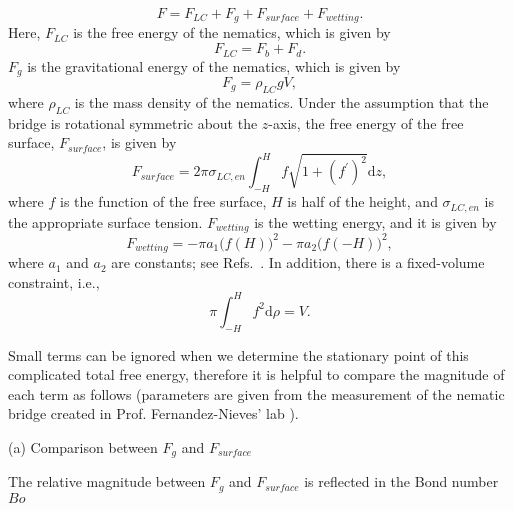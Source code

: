 \documentclass[nottitlepage]{article}
\begin{document}
\begin{equation}\label{eq:F17}
 F=F_{LC}+F_{g}+F_{surface}+F_{wetting}.
\end{equation}
Here, $F_{LC}$ is the free energy of the nematics, which is given by
\begin{equation}\label{eq:F18}
F_{LC}=F_{b}+F_{d}.
\end{equation}
$F_{g}$ is the gravitational energy of the nematics, which is given by
\begin{equation}\label{eq:F19}
F_{g}=\rho_{LC}gV,
\end{equation}
where $\rho_{LC}$ is the mass density of the nematics. Under the assumption that the bridge is rotational symmetric about the $z$-axis, the free energy of the free surface, $F_{surface}$, is given by
\begin{equation}\label{eq:F20}
 F_{surface}=2\pi\sigma_{LC,en}\int_{-H}^{H}f\sqrt{1+(f^{'})^2}\mathrm{d}z,
\end{equation}
where $f$ is the function of the free surface, $H$ is half of the height, and $\sigma_{LC,en}$ is the appropriate surface tension. $F_{wetting}$ is the wetting energy, and it is given by
 \begin{equation}\label{eq:F21}
  F_{wetting}=-\pi a_1 \Big(f(H)\Big)^2-\pi a_2 \Big(f(-H)\Big)^2,
 \end{equation}
where $a_1$ and $a_2$ are constants; see Refs.~\cite{vogel, vogel2}.  In addition, there is a fixed-volume constraint, i.e.,
\begin{equation}\label{eq:pi}
\pi\int_{-H}^{H}f^2\mathrm{d}\rho=V.
\end{equation}















Small terms can be ignored when we determine the stationary point of this complicated total free energy, therefore it is helpful to compare the magnitude of each term as follows (parameters are given from the measurement of the nematic bridge created in Prof. Fernandez-Nieves' lab \cite{perry}).

(a) Comparison between $F_{g}$ and $F_{surface}$

The relative magnitude between $F_{g}$ and $F_{surface}$ is reflected in the Bond number $Bo$ \cite{sanz}
\end{document}
